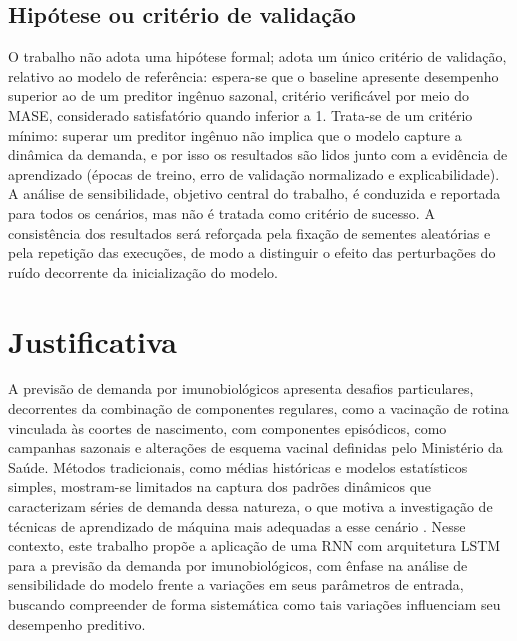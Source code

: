 \documentclass[
    12pt,
    openright,
    oneside,
    a4paper,
    english,
    brazil
]{abntex2}
\begin{document}
\subsection{Hipótese ou critério de validação}
\label{sec:hipotese}

O trabalho não adota uma hipótese formal; adota um único critério de validação, relativo ao modelo de referência: espera-se que o baseline apresente desempenho superior ao de um preditor ingênuo sazonal, critério verificável por meio do MASE, considerado satisfatório quando inferior a 1. Trata-se de um critério mínimo: superar um preditor ingênuo não implica que o modelo capture a dinâmica da demanda, e por isso os resultados são lidos junto com a evidência de aprendizado (épocas de treino, erro de validação normalizado e explicabilidade). A análise de sensibilidade, objetivo central do trabalho, é conduzida e reportada para todos os cenários, mas não é tratada como critério de sucesso. A consistência dos resultados será reforçada pela fixação de sementes aleatórias e pela repetição das execuções, de modo a distinguir o efeito das perturbações do ruído decorrente da inicialização do modelo.

\section{Justificativa}
\label{sec:justificativa}

A previsão de demanda por imunobiológicos apresenta desafios particulares, decorrentes da combinação de componentes regulares, como a vacinação de rotina vinculada às coortes de nascimento, com componentes episódicos, como campanhas sazonais e alterações de esquema vacinal definidas pelo Ministério da Saúde. Métodos tradicionais, como médias históricas e modelos estatísticos simples, mostram-se limitados na captura dos padrões dinâmicos que caracterizam séries de demanda dessa natureza, o que motiva a investigação de técnicas de aprendizado de máquina mais adequadas a esse cenário \cite{math14050838}. Nesse contexto, este trabalho propõe a aplicação de uma RNN com arquitetura LSTM para a previsão da demanda por imunobiológicos, com ênfase na análise de sensibilidade do modelo frente a variações em seus parâmetros de entrada, buscando compreender de forma sistemática como tais variações influenciam seu desempenho preditivo.
\end{document}
